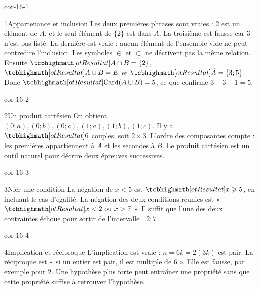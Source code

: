 \clearpage\pagestyle{otMain}\fontsize{11}{15}\selectfont
{}
\begin{blocLivre}{cor-16-1}
\begin{corrige}{1}{Appartenance et inclusion}
Les deux premières phrases sont vraies : 2 est un élément de $A$, et le seul élément de $\{2\}$ est dans $A$. La troisième est fausse car 3 n’est pas listé. La dernière est vraie : aucun élément de l’ensemble vide ne peut contredire l’inclusion. Les symboles $\in$ et $\subset$ ne décrivent pas la même relation. Ensuite $\res{A\cap B=\{2\}}$, $\res{A\cup B=E}$ et $\res{\overline A=\{3;5\}}$. Donc $\res{\operatorname{Card}(A\cup B)=5}$, ce que confirme $3+3-1=5$.
\end{corrige}
\end{blocLivre}
\begin{blocLivre}{cor-16-2}
\begin{corrige}{2}{Un produit cartésien}
On obtient $(0;a),(0;b),(0;c),(1;a),(1;b),(1;c)$. Il y a $\res6$ couples, soit $2\times3$. L’ordre des composantes compte : les premières appartiennent à $A$ et les secondes à $B$. Le produit cartésien est un outil naturel pour décrire deux épreuves successives.
\end{corrige}
\end{blocLivre}
\begin{blocLivre}{cor-16-3}
\begin{corrige}{3}{Nier une condition}
La négation de $x<5$ est $\res{x\ge5}$, en incluant le cas d’égalité. La négation des deux conditions réunies est « $\res{x<2\text{ ou }x>7}$ ». Il suffit que l’une des deux contraintes échoue pour sortir de l’intervalle $[2;7]$.
\end{corrige}
\end{blocLivre}
\begin{blocLivre}{cor-16-4}
\begin{corrige}{4}{Implication et réciproque}
L’implication est vraie : $n=6k=2(3k)$ est pair. La réciproque est « si un entier est pair, il est multiple de 6 ». Elle est fausse, par exemple pour 2. Une hypothèse plus forte peut entraîner une propriété sans que cette propriété suffise à retrouver l’hypothèse.
\end{corrige}
\end{blocLivre}
